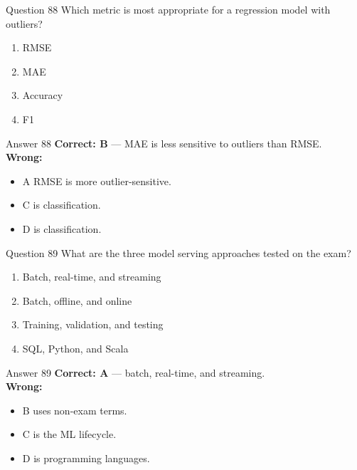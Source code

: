 \documentclass[aspectratio=169,11pt]{beamer}
\begin{document}
	\begin{frame}{Question 88}
		Which metric is most appropriate for a regression model with outliers?
		\begin{enumerate}[label=\Alph*.]
			\item RMSE
			\item MAE
			\item Accuracy
			\item F1
		\end{enumerate}
	\end{frame}
	\begin{frame}{Answer 88}
		\textbf{Correct: B} --- MAE is less sensitive to outliers than RMSE.\\
		\vspace{0.5em}
		\textbf{Wrong:}
		\begin{itemize}
			\item A RMSE is more outlier-sensitive.
			\item C is classification.
			\item D is classification.
		\end{itemize}
	\end{frame}
	
	\begin{frame}{Question 89}
		What are the three model serving approaches tested on the exam?
		\begin{enumerate}[label=\Alph*.]
			\item Batch, real-time, and streaming
			\item Batch, offline, and online
			\item Training, validation, and testing
			\item SQL, Python, and Scala
		\end{enumerate}
	\end{frame}
	\begin{frame}{Answer 89}
		\textbf{Correct: A} --- batch, real-time, and streaming.\\
		\vspace{0.5em}
		\textbf{Wrong:}
		\begin{itemize}
			\item B uses non-exam terms.
			\item C is the ML lifecycle.
			\item D is programming languages.
		\end{itemize}
	\end{frame}
	
\end{document}
